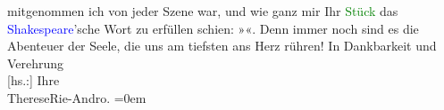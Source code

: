                mitgenommen ich von jeder Szene war, und wie ganz mir Ihr \textcolor{green}{Stück}{} das \textcolor{blue}{Shakespeare}{}\ledrightnote{\textcolor{blue}{William Shakespeare}}’sche Wort zu erfüllen schien: »\label{K_L02567-2v}\label{K_L02567-2h}«. Denn immer
               noch sind es die Abenteuer der Seele, die uns am tiefsten ans Herz rühren!\pend
           \pstart
           In Dankbarkeit und Verehrung{\\[\baselineskip]}{[}hs.:{]} Ihre{\\[\baselineskip]}\spacefill\mbox{ThereseRie-Andro.}\pend
           \leftskip=0em{}\endnumbering{}  
      